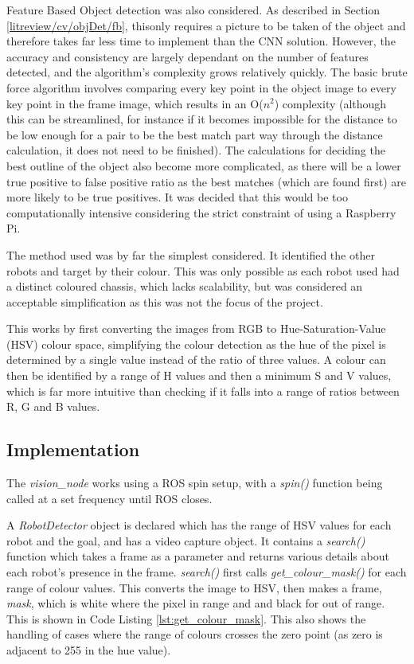 Feature Based Object detection was also considered. As described in Section \ref{litreview/cv/objDet/fb}, thisonly requires a picture to be taken of the object and therefore takes far less time to 
implement than the CNN solution. However, the accuracy and 
consistency are largely dependant on the number of features 
detected, and the algorithm's complexity grows relatively 
quickly. The basic brute force algorithm involves comparing 
every key point in the object image to every key point in the 
frame image, which results in an O($n^2$) complexity (although 
this can be streamlined, for instance if it becomes impossible 
for the distance to be low enough for a pair to be the best 
match part way through the distance calculation, it does not 
need to be finished). The calculations for deciding the best 
outline of the object also become more complicated, as there 
will be a lower true positive to false positive ratio as the 
best matches (which are found first) are more likely to be 
true positives. It was decided that this would be too  
computationally intensive considering the strict constraint of 
using a Raspberry Pi. 

The method used was by far the simplest considered. It identified the other robots and target by their colour. This was only possible as each robot used had a distinct coloured chassis, which lacks scalability, but was considered an acceptable simplification as this was not the focus of the project. 

This works by first converting the images from RGB to Hue-Saturation-Value (HSV) colour space, simplifying the colour detection as the hue of the pixel is determined by a single value instead of the ratio of three values. A colour can then be identified by a range of H values and then a minimum S and V values, which is far more intuitive than checking if it falls into a range of ratios between R, G and B values. 

\subsection{Implementation}\label{soft/cv/impl}
The \textit{vision\_node} works using a ROS spin setup, with a \textit{spin()} function being called at a set frequency until ROS closes. 

A \textit{RobotDetector} object is declared which has the range of HSV values for each robot and the goal, and has a video capture object. It contains a \textit{search()} function which takes a frame as a parameter and returns various details about each robot's presence in the frame. \textit{search()} first calls \textit{get\_colour\_mask()} for each range of colour values. This converts the image to HSV, then makes a frame, \textit{mask}, which is white where the pixel in range and and black for out of range. This is shown in Code Listing \ref{lst:get_colour_mask}. This also shows the handling of cases where the range of colours crosses the zero point (as zero is adjacent to 255 in the hue value).

